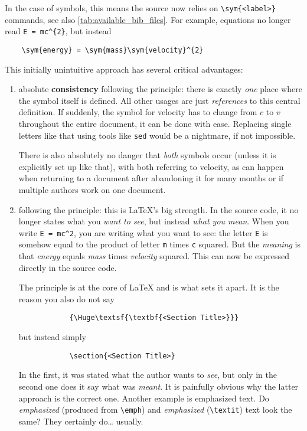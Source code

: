 In the case of symbols, this means the source now relies on \verb|\sym{<label>}|
commands, see also \cref{tab:available_bib_files}.
For example, equations no longer read \verb|E = mc^{2}|, but instead
\begin{verbatim}
    \sym{energy} = \sym{mass}\sym{velocity}^{2}
\end{verbatim}
This initially unintuitive approach has several critical advantages:
\begin{enumerate}
    \item absolute \textbf{consistency} following the 
        principle:
        there is exactly \emph{one} place where the symbol itself is defined.
        All other usages are just \emph{references} to this central definition.
        If suddenly, the symbol for velocity has to change from \(c\) to \(v\)
        throughout the entire document, it can be done with ease.
        Replacing single letters like that using tools like \texttt{sed} would be a
        nightmare, if not impossible.

        There is also absolutely no danger that \emph{both} symbols occur (unless
        it is explicitly set up like that), with both referring to velocity,
        as can happen when returning to a document after abandoning it for many months
        or if multiple authors work on one document.
    \item following the \textbf{} principle:
        this is \LaTeX{}'s big strength.
        In the source code, it no longer states what you \emph{want to see}, but
        instead \emph{what you mean}.
        When you write \verb|E = mc^2|, you are writing what you want to see:
        the letter \texttt{E} is somehow equal to the product of letter \texttt{m}
        times \texttt{c} squared.
        But the \emph{meaning} is that \emph{energy} equals \emph{mass} times
        \emph{velocity} squared.
        This can now be expressed directly in the source code.

        The  principle is at the core of \LaTeX{}
        and is what sets it apart.
        It is the reason you also do not say
        \begin{verbatim}
            {\Huge\textsf{\textbf{<Section Title>}}}
        \end{verbatim}
        but instead simply
        \begin{verbatim}
            \section{<Section Title>}
        \end{verbatim}
        In the first, it was stated what the author wants to \emph{see}, but only
        in the second one does it say what was \emph{meant}.
        It is painfully obvious why the latter approach is the correct one.
        Another example is emphasized text.
        Do \emph{emphasized} (produced from \verb|\emph|) and \textit{emphasized}
        (\verb|\textit|) text look the same?
        They certainly do\dots{} usually.


\end{enumerate}
